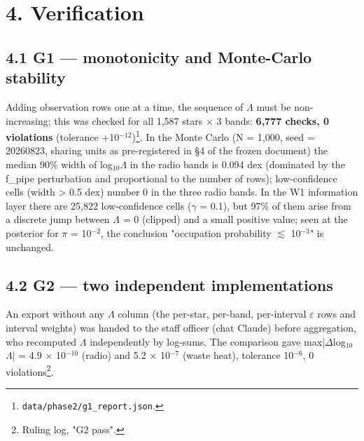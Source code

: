 \documentclass[11pt]{article}
\begin{document}
\section*{4. Verification}

\subsection*{4.1 G1 --- monotonicity and Monte-Carlo stability}
\noindent Adding observation rows one at a time, the sequence of \(\Lambda\) must be non-increasing; this was checked for all 1,587 stars \(\times\) 3 bands: \textbf{6,777 checks, 0 violations} (tolerance +10\(^{-12}\))\footnote{\texttt{data/phase2/g1\_report.json}.}. In the Monte Carlo (N = 1,000, seed = 20260823, sharing units as pre-registered in \S{}4 of the frozen document) the median 90\% width of log\(_{10}\)\(\Lambda\) in the radio bands is 0.094 dex (dominated by the f\_pipe perturbation and proportional to the number of rows); low-confidence cells (width > 0.5 dex) number 0 in the three radio bands. In the W1 information layer there are 25,822 low-confidence cells (\(\gamma\) = 0.1), but 97\% of them arise from a discrete jump between \(\Lambda\) = 0 (clipped) and a small positive value; seen at the posterior for \(\pi\) = 10\(^{-2}\), the conclusion "occupation probability \(\lesssim\) 10\(^{-3}\)" is unchanged.\par\smallskip


\subsection*{4.2 G2 --- two independent implementations}
\noindent An export without any \(\Lambda\) column (the per-star, per-band, per-interval \(\varepsilon\) rows and interval weights) was handed to the staff officer (chat Claude) before aggregation, who recomputed \(\Lambda\) independently by log-sums. The comparison gave max|\(\Delta\)log\(_{10}\)\(\Lambda\)| = 4.9 \(\times\) 10\(^{-10}\) (radio) and 5.2 \(\times\) 10\(^{-7}\) (waste heat), tolerance 10\(^{-6}\), 0 violations\footnote{Ruling log, "G2 pass".}.\par\smallskip
\end{document}
